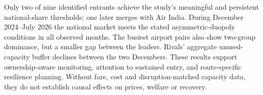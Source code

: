 \documentclass[12pt,a4paper]{article}
\begin{document}
Only two of nine identified entrants achieve the study's meaningful and persistent national-share thresholds; one later merges with Air India. During December 2024--July 2026 the national market meets the stated asymmetric-duopoly conditions in all observed months. The busiest airport pairs also show two-group dominance, but a smaller gap between the leaders. Rivals' aggregate unused-capacity buffer declines between the two Decembers. These results support ownership-aware monitoring, attention to sustained entry, and route-specific resilience planning. Without fare, cost and disruption-matched capacity data, they do not establish causal effects on prices, welfare or recovery.

\newpage
\nocite{kubicek2026aviationstats,dgcaDomesticSchedules}
\nocite{grosche2020concentration,jasrotia2025gofirst,jayathilakan2024determinants,kubicek2026aviationstats,kumari2026soaring,oliveira2018effective,soman2024jet,wang2018determinants}
\printbibliography[title={References}]
\end{document}
